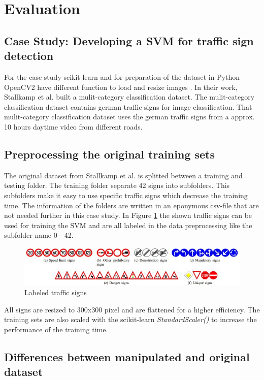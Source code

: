 \section{Evaluation}
\label{sec:evaluation}

\subsection{Case Study: Developing a SVM for traffic sign detection}

For the case study scikit-learn \cite{scikit-learn} and for preparation of the dataset in Python OpenCV2 have different function to load and resize images \cite{opencv_library}. In their work, Stallkamp et al. \cite{DBLP:conf/ijcnn/StallkampSSI11} built a mulit-category classification dataset. The mulit-category classification dataset contains german traffic signs for image classification. That mulit-category classification dataset uses the german traffic signs from a approx. 10 hours daytime video from different roads.

\subsection{Preprocessing the original training sets}

The original dataset from Stallkamp et al. is splitted between a training and testing folder. The training folder separate 42 signs into subfolders. This subfolders make it easy to use specific traffic signs which decrease the training time. The information of the folders are written in an eponymous csv-file that are not needed further in this case study. In Figure \ref{fig:traffic_signs} the shown traffic signs can be used for training the SVM and are all labeled in the data preprocessing like the subfolder name 0 - 42.

\begin{figure}[h!]
  \centering
  \includegraphics[width=12cm]{pictures/traffic_signs.jpg}
  \caption{Labeled traffic signs \cite{DBLP:conf/ijcnn/StallkampSSI11}}
  \label{fig:traffic_signs}
\end{figure}

All signs are resized to 300x300 pixel and are flattened for a higher efficiency. The training sets are also scaled with the scikit-learn \textit{StandardScaler()} to increase the performance of the training time.

\subsection{Differences between manipulated and original dataset}
